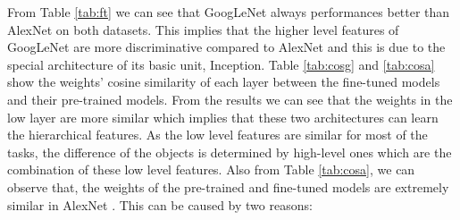 From Table \ref{tab:ft} we can see that GoogLeNet always performances better than AlexNet on both datasets. This implies that the higher level features of GoogLeNet are more discriminative compared to AlexNet and this is due to the special architecture of its basic unit, Inception. Table \ref{tab:cosg} and \ref{tab:cosa} show the weights' cosine similarity of each layer between the fine-tuned models and their pre-trained models. From the results we can see that the weights in the low layer are more similar which implies that these two architectures can learn the hierarchical features. As the low level features are similar for most of the tasks, the difference of the objects is determined by high-level ones which are the combination of these low level features. Also from Table \ref{tab:cosa}, we can observe that, the weights of the pre-trained and fine-tuned models are extremely similar in AlexNet . This can be caused by two reasons:

